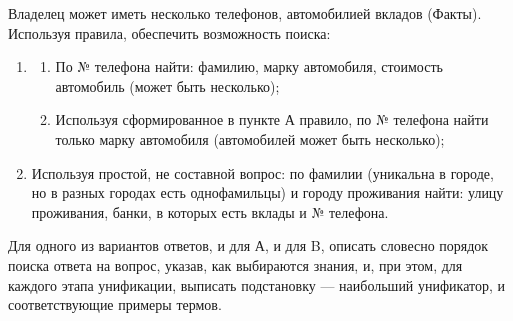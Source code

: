 \documentclass[12pt]{report}
\begin{document}
Владелец может иметь несколько телефонов, автомобилией вкладов (Факты). Используя правила, обеспечить возможность поиска:

\begin{enumerate}
	\item \begin{enumerate}[label=\alph*)]
		\item По № телефона найти: фамилию, марку автомобиля, стоимость автомобиль (может быть несколько);
		\item Используя сформированное в пункте А правило, по № телефона найти только марку автомобиля (автомобилей может быть несколько);
	\end{enumerate}
	\item Используя простой, не составной вопрос: по фамилии (уникальна в городе, но в разных городах есть однофамильцы) и городу проживания найти: улицу проживания, банки, в которых есть вклады и № телефона.
\end{enumerate}

Для одного из вариантов ответов, и для А, и для B, описать словесно порядок поиска ответа на вопрос, указав, как выбираются знания, и, при этом, для каждого этапа унификации, выписать подстановку — наибольший унификатор, и соответствующие примеры термов.

\newpage
\end{document}
